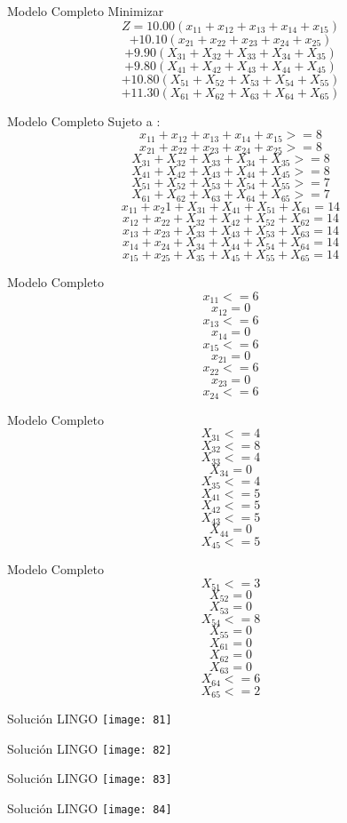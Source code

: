 \documentclass{beamer}
\begin{document}
\begin{frame}[fragile]{Modelo Completo}
Minimizar\\
    \[Z = 10.00 (x_{11} + x_{12} +x_{13}+x_{14} +x_{15}) \]
      \[+ 10.10 (x_{21} + x_{22} +x_{23}+x_{24} + x_{25})\]
      \[+  9.90 (X_{31} + X_{32} +X_{33}+X_{34} +X_{35})\]
      \[+ 9.80  (X_{41} + X_{42} +X_{43}+X_{44} +X_{45})\]
      \[+ 10.80  (X_{51} + X_{52} +X_{53}+X_{54} +X_{55})\]
      \[+ 11.30  (X_{61} + X_{62} +X_{63}+X_{64} +X_{65})\]

\end{frame}

\begin{frame}[fragile]{Modelo Completo}
Sujeto a :\\
\[x_{11} + x_{12} +x_{13}+x_{14} +x_{15} >=8\]
\[x_{21} + x_{22} +x_{23}+x_{24} + x_{25} >= 8\]
\[X_{31} + X_{32} +X_{33}+X_{34} +X_{35} >= 8\]
\[X_{41} + X_{42} +X_{43}+X_{44} +X_{45} >= 8\]
\[X_{51} + X_{52} +X_{53}+X_{54} +X_{55} >= 7\]
\[X_{61} + X_{62} +X_{63}+X_{64} +X_{65} >= 7\]
\[x_{11} + x_{2}1 + X_{31} +X_{41} + X_{51} +X_{61} = 14  \]
\[x_{12} + x_{22} + X_{32} +X_{42} + X_{52} + X_{62} = 14\]
\[x_{13} + x_{23} + X_{33} +X_{43} + X_{53} +X_{63} = 14\]
\[x_{14} + x_{24} + X_{34} +X_{44} + X_{54} +X_{64} = 14\]
\[x_{15} + x_{25} + X_{35} +X_{45} + X_{55} +X_{65} = 14  \]
\end{frame}
\begin{frame}[fragile]{Modelo Completo}
\[x_{11} <= 6\]
        \[x_{12} = 0\]
        \[x_{13} <= 6\]
        \[x_{14}  = 0\]
        \[x_{15} <= 6\]
        \[x_{21} = 0 \]
        \[x_{22} <= 6\]
        \[x_{23} = 0\]
        \[x_{24}  <= 6\]
\end{frame}

\begin{frame}[fragile]{Modelo Completo}
\[X_{31} <= 4 \]
\[X_{32} <= 8\]
\[X_{33} <= 4\]
\[X_{34}  = 0\]
\[X_{35} <= 4\]
\[X_{41} <= 5 \]
\[X_{42} <= 5\]
\[X_{43} <= 5\]
\[X_{44} = 0\]
\[X_{45} <= 5\]
\end{frame}
\begin{frame}[fragile]{Modelo Completo}
\[X_{51} <= 3 \]
\[X_{52} = 0\]
\[X_{53} = 0\]
\[X_{54}  <=  8\]
\[X_{55} = 0\]
\[X_{61} = 0 \]
\[X_{62} = 0\]
\[X_{63} = 0\]
\[X_{64}  <=  6\]
\[X_{65} <= 2\]
\end{frame}

\begin{frame}[fragile]{Solución LINGO}
    \texttt{[image: 81]}
\end{frame}
\begin{frame}[fragile]{Solución LINGO}
    \texttt{[image: 82]}
\end{frame}
\begin{frame}[fragile]{Solución LINGO}
    \texttt{[image: 83]}
\end{frame}
\begin{frame}[fragile]{Solución LINGO}
    \texttt{[image: 84]}
\end{frame}
\end{document}
